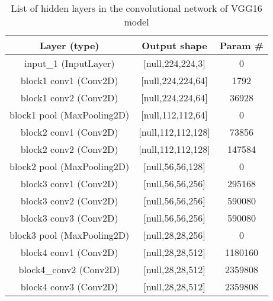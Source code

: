 \begin{table}[!t]
  \renewcommand{\arraystretch}{1.3}

  \caption{List of hidden layers in the convolutional network of VGG16 model}
  \label{table1}

  \centering
  \begin{tabular}{|c|c|c|} \hline
  
  Layer (type) & Output shape & Param # \\ 
  \hline


    input_1 (InputLayer) & [null,224,224,3] & 0 \\
    \hline
    
    block1 conv1 (Conv2D) & [null,224,224,64] & 1792 \\
    \hline
    
    block1 conv2 (Conv2D) & [null,224,224,64] & 36928 \\
    \hline
    
    
    block1 pool (MaxPooling2D) & [null,112,112,64] & 0 \\
    \hline
    
    block2 conv1 (Conv2D) & [null,112,112,128] & 73856 \\
    \hline
    
    block2 conv2 (Conv2D) & [null,112,112,128] & 147584 \\
    \hline
    
    block2 pool (MaxPooling2D) & [null,56,56,128] & 0 \\
    \hline
    
    block3 conv1 (Conv2D) & [null,56,56,256] & 295168 \\
    \hline
    
    block3 conv2 (Conv2D) & [null,56,56,256] & 590080 \\
    \hline
    
    block3 conv3 (Conv2D) & [null,56,56,256] & 590080 \\
    \hline
    
    block3 pool (MaxPooling2D) & [null,28,28,256] & 0 \\
    \hline
    
    block4 conv1 (Conv2D) & [null,28,28,512] & 1180160 \\
    \hline
    
    block4_conv2 (Conv2D) & [null,28,28,512] & 2359808 \\
    \hline
    
    block4 conv3 (Conv2D) & [null,28,28,512] & 2359808 \\
    \hline
    

\end{tabular}
\end{table}
